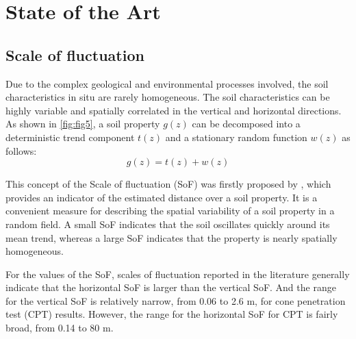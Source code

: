 \chapter{State of the Art}

\label{ch:State}

\section{Scale of fluctuation}


Due to the complex geological and environmental processes involved, the soil characteristics in situ are rarely homogeneous. The soil characteristics can be highly variable and spatially correlated in the vertical and horizontal directions. As shown in \cref{fig:fig5}, a soil property $g\left ( z \right )$ can be decomposed into a deterministic trend component $t\left ( z \right )$ and a stationary random function $w\left ( z \right )$ as follows: 
\begin{equation}
g\left ( z \right ) = t\left ( z \right ) +  w\left ( z \right ) 
\end{equation}

This concept of the Scale of fluctuation (SoF) was firstly proposed by \cite{vanmarcke1977}, which provides an indicator of the estimated distance over a soil property. It is a convenient measure for describing the spatial variability of a soil property in a random field. A small SoF indicates that the soil oscillates quickly around its mean trend, whereas a large SoF indicates that the property is nearly spatially homogeneous.








For the values of the SoF, scales of fluctuation reported in the literature generally indicate that the horizontal SoF is larger than the vertical SoF. And the range for the vertical SoF is relatively narrow, from 0.06 to 2.6 m, for cone penetration test (CPT) results. However, the range for the horizontal SoF for CPT is fairly broad, from 0.14 to 80 m.




